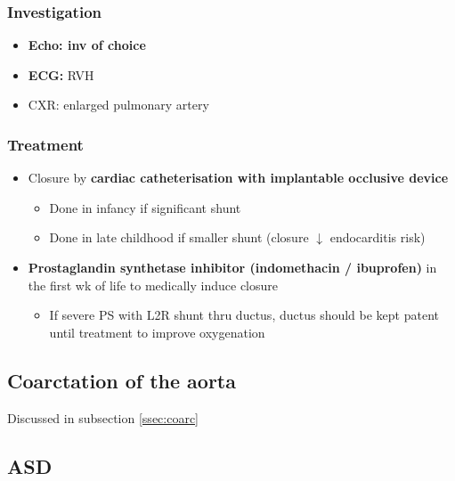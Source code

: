 \documentclass[
  12pt,
]{memoir}
\providecommand{\tightlist}{%
  \setlength{\itemsep}{0pt}\setlength{\parskip}{0pt}}
\begin{document}
\hypertarget{investigation-15}{%
\subsubsection{Investigation}\label{investigation-15}}

\begin{itemize}
\tightlist
\item
  \textbf{Echo: inv of choice}
\item
  \textbf{ECG:} RVH
\item
  CXR: enlarged pulmonary artery
\end{itemize}

\hypertarget{treatment-5}{%
\subsubsection{Treatment}\label{treatment-5}}

\begin{itemize}
\tightlist
\item
  Closure by \textbf{cardiac catheterisation with implantable occlusive
  device}

  \begin{itemize}
  \tightlist
  \item
    Done in infancy if significant shunt
  \item
    Done in late childhood if smaller shunt (closure \(\downarrow\)
    endocarditis risk)
  \end{itemize}
\item
  \textbf{Prostaglandin synthetase inhibitor (indomethacin / ibuprofen)}
  in the first wk of life to medically induce closure

  \begin{itemize}
  \tightlist
  \item
    If severe PS with L2R shunt thru ductus, ductus should be kept
    patent until treatment to improve oxygenation
  \end{itemize}
\end{itemize}

\hypertarget{coarctation-of-the-aorta-1}{%
\subsection{Coarctation of the aorta}\label{coarctation-of-the-aorta-1}}

Discussed in subsection \ref{ssec:coarc}

\hypertarget{asd}{%
\subsection{ASD}\label{asd}}
\end{document}
